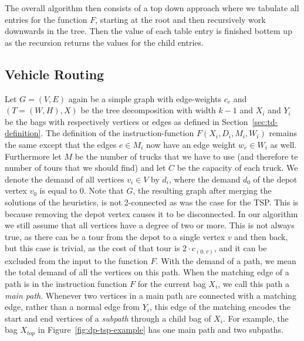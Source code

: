 \documentclass[12pt]{article}
\begin{document}
    The overall algorithm then consists of a top down approach where we tabulate all entries for
    the function $F$, starting at the root and then recursively work downwards in the tree. Then the
    value of each table entry is finished bottem up as the recursion returns the values for the
    child entries.



    \subsection{Vehicle Routing}
    \label{sec:dp-vrp}
    Let $G=(V, E)$ again be a simple graph with edge-weights $c_e$ and $(T=(W, H), X)$ be the tree
    decomposition with width $k - 1$ and $X_i$ and $Y_i$ be the bags with respectively vertices or
    edges as defined in Section~\ref{sec:td-definition}.
    The definition of the instruction-function $F(X_i, D_i, M_i, W_i)$ remains the same except that
    the edges $e \in M_i$ now have an edge weight $w_e \in W_i$ as well.
    Furthermore let $M$ be the number of trucks that we have to use (and therefore te number of
    tours that we should find) and let $C$ be the capacity of each truck. We denote the demand of
    all vertices $v_i \in V$ by $d_i$, where the demand $d_0$ of the depot vertex $v_0$ is equal to 0.
    Note that $G$, the resulting graph after merging the solutions of the heuristics, is not
    2-connected as was the case for the TSP\@. This is because removing the depot vertex causes it
    to be disconnected. In our algorithm we still assume that all vertices have a degree of two or
    more. This is not always true, as there can be a tour from the depot to a single vertex $v$ and
    then back, but this case is trivial, as the cost of that tour is $2 \cdot c_{(0, v)}$, and it
    can be excluded from the input to the function $F$.
    With the demand of a path, we mean the total demand of all the vertices on this path.
    When the matching edge of a path is in the instruction function $F$ for the current bag $X_i$,
    we call this path a \emph{main path}.
    Whenever two vertices in a main path are connected with a matching edge, rather than a normal
    edge from $Y_i$, this edge of the matching encodes the start and end vertices of a
    \emph{subpath} through a child bag of $X_i$.
    For example, the bag $X_{top}$ in Figure~\ref{fig:dp-tsp-example} has one main path and two
    subpaths.
\end{document}
